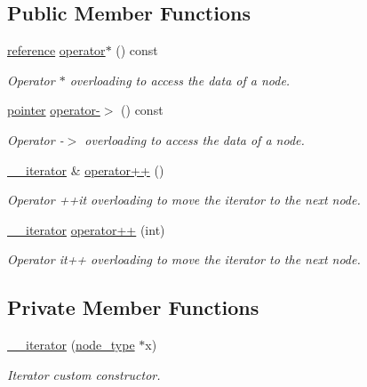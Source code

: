 \subsection*{Public Member Functions}
\begin{DoxyCompactItemize}
\item 
\hyperlink{classbst_1_1____iterator_a3189983e4edb73a8ce449b290ceb97d1}{reference} \hyperlink{classbst_1_1____iterator_a48688559dd7c14b19228c58466dc9880}{operator$\ast$} () const
\begin{DoxyCompactList}\small\item\em Operator $\ast$ overloading to access the data of a node. \end{DoxyCompactList}\item 
\hyperlink{classbst_1_1____iterator_adb4d1d8f8048f7036ff5ac383ea9c649}{pointer} \hyperlink{classbst_1_1____iterator_a66e7536009f3948f71f6cbdffe5fd337}{operator-\/$>$} () const
\begin{DoxyCompactList}\small\item\em Operator -\/$>$ overloading to access the data of a node. \end{DoxyCompactList}\item 
\hyperlink{classbst_1_1____iterator}{\+\_\+\+\_\+iterator} \& \hyperlink{classbst_1_1____iterator_a0551167f26a1769faa27afd7018eeb03}{operator++} ()
\begin{DoxyCompactList}\small\item\em Operator ++it overloading to move the iterator to the next node. \end{DoxyCompactList}\item 
\hyperlink{classbst_1_1____iterator}{\+\_\+\+\_\+iterator} \hyperlink{classbst_1_1____iterator_a0a43380fa33e82342236ef747a5e72e2}{operator++} (int)
\begin{DoxyCompactList}\small\item\em Operator it++ overloading to move the iterator to the next node. \end{DoxyCompactList}\end{DoxyCompactItemize}
\subsection*{Private Member Functions}
\begin{DoxyCompactItemize}
\item 
\hyperlink{classbst_1_1____iterator_a0fabfd3d99d7c15da13123229a4cbede}{\+\_\+\+\_\+iterator} (\hyperlink{classbst_a062eb2a1ac54802dbc4f0f74ae2afd01}{node\+\_\+type} $\ast$x)
\begin{DoxyCompactList}\small\item\em Iterator custom constructor. \end{DoxyCompactList}\end{DoxyCompactItemize}
